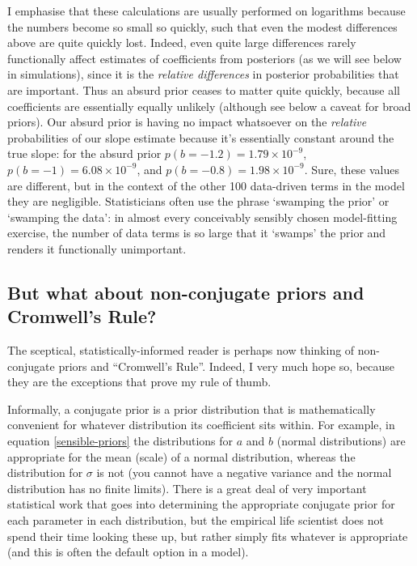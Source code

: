\documentclass[12pt]{report}
\begin{document}
I emphasise that these calculations are usually performed on logarithms because the numbers become so small so quickly, such that even the modest differences above are quite quickly lost. Indeed, even quite large differences rarely functionally affect estimates of coefficients from posteriors (as we will see below in simulations), since it is the \emph{relative differences} in posterior probabilities that are important. Thus an absurd prior ceases to matter quite quickly, because all coefficients are essentially equally unlikely (although see below a caveat for broad priors). Our absurd prior is having no impact whatsoever on the \emph{relative} probabilities of our slope estimate because it's essentially constant around the true slope: for the absurd prior $p(b=-1.2)=1.79\times10^{-9}$, $p(b=-1)=6.08\times10^{-9}$, and $p(b=-0.8)=1.98\times10^{-9}$. Sure, these values are different, but in the context of the other 100 data-driven terms in the model they are negligible. Statisticians often use the phrase `swamping the prior' or `swamping the data': in almost every conceivably sensibly chosen model-fitting exercise, the number of data terms is so large that it `swamps' the prior and renders it functionally unimportant.

\subsection*{But what about non-conjugate priors and Cromwell's Rule?}
The sceptical, statistically-informed reader is perhaps now thinking of non-conjugate priors and ``Cromwell's Rule''. Indeed, I very much hope so, because they are the exceptions that prove my rule of thumb.

Informally, a conjugate prior is a prior distribution that is mathematically convenient for whatever distribution its coefficient sits within. For example, in equation \ref{sensible-priors} the distributions for $a$ and $b$ (normal distributions) are appropriate for the mean (scale) of a normal distribution, whereas the distribution for $\sigma$ is not (you cannot have a negative variance and the normal distribution has no finite limits). There is a great deal of very important statistical work that goes into determining the appropriate conjugate prior for each parameter in each distribution, but the empirical life scientist does not spend their time looking these up, but rather simply fits whatever is appropriate (and this is often the default option in a model).
\end{document}
